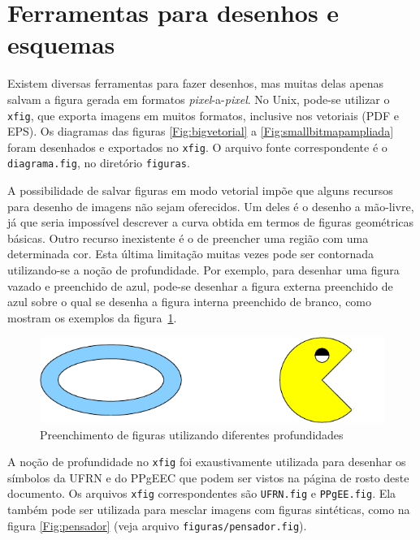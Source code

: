 \section{Ferramentas para desenhos e esquemas}
\label{Sec:desenhos}

Existem diversas ferramentas para fazer desenhos, mas muitas delas
apenas salvam a figura gerada em formatos \emph{pixel}-a-\emph{pixel}.
No Unix, pode-se utilizar o \texttt{xfig}, que exporta imagens em
muitos formatos, inclusive nos vetoriais (PDF e EPS). Os diagramas das
figuras \ref{Fig:bigvetorial} a \ref{Fig:smallbitmapampliada} foram
desenhados e exportados no \texttt{xfig}. O arquivo fonte
correspondente é o \texttt{diagrama.fig}, no diretório
\texttt{figuras}.

A possibilidade de salvar figuras em modo vetorial impõe que alguns
recursos para desenho de imagens não sejam oferecidos. Um deles é o
desenho a mão-livre, já que seria impossível descrever a curva obtida
em termos de figuras geométricas básicas. Outro recurso inexistente é
o de preencher uma região com uma determinada cor. Esta última
limitação muitas vezes pode ser contornada utilizando-se a noção de
profundidade.  Por exemplo, para desenhar uma figura vazado e
preenchido de azul, pode-se desenhar a figura externa preenchido de
azul sobre o qual se desenha a figura interna preenchido de branco,
como mostram os exemplos da figura~\ref{Fig:circulo}.

\begin{figure}[htb] \begin{center}
\includegraphics{textuais/04-problema/figuras/circulo}
\caption{Preenchimento de figuras utilizando diferentes profundidades}
\label{Fig:circulo}
\end{center} \end{figure}

A noção de profundidade no \texttt{xfig} foi exaustivamente utilizada
para desenhar os símbolos da UFRN e do PPgEEC que podem ser vistos na
página de rosto deste documento. Os arquivos \texttt{xfig}
correspondentes são \texttt{UFRN.fig} e \texttt{PPgEE.fig}. Ela também
pode ser utilizada para mesclar imagens com figuras sintéticas, como
na figura \ref{Fig:pensador} (veja arquivo \texttt{figuras/pensador.fig}).

